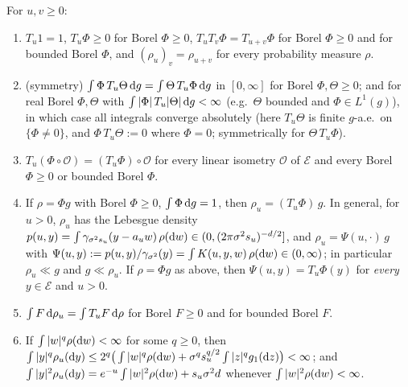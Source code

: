 \begin{lemma}\label{lem:M1}
For $u,v\ge0$:
\begin{enumerate}[label=(\roman*),itemsep=1pt]
\item $T_u1=1$, $T_u\Phi\ge0$ for Borel $\Phi\ge0$, $T_uT_v\Phi=T_{u+v}\Phi$ for Borel $\Phi\ge0$ and for bounded Borel $\Phi$, and $(\rho_u)_v=\rho_{u+v}$ for every probability measure $\rho$.
\item (symmetry) $\int\Phi\,T_u\Theta\,\mathrm{d} g=\int\Theta\,T_u\Phi\,\mathrm{d} g$ in $[0,\infty]$ for Borel $\Phi,\Theta\ge0$; and for real Borel $\Phi,\Theta$ with $\int|\Phi|\,T_u|\Theta|\,\mathrm{d} g<\infty$ (e.g.\ $\Theta$ bounded and $\Phi\in L^1(g)$), in which case all integrals converge absolutely (here $T_u\Theta$ is finite $g$-a.e.\ on $\{\Phi\ne0\}$, and $\Phi\,T_u\Theta:=0$ where $\Phi=0$; symmetrically for $\Theta\,T_u\Phi$).
\item $T_u(\Phi\circ\mathcal O)=(T_u\Phi)\circ\mathcal O$ for every linear isometry $\mathcal O$ of $\mathcal E$ and every Borel $\Phi\ge0$ or bounded Borel $\Phi$.
\item If $\rho=\Phi g$ with Borel $\Phi\ge0$, $\int\Phi\,\mathrm{d} g=1$, then $\rho_u=(T_u\Phi)\,g$.
In general, for $u>0$, $\rho_u$ has the Lebesgue density $p(u,y)=\int\gamma_{\sigma^2s_u}(y-a_uw)\,\rho(\mathrm{d} w)\in(0,(2\pi\sigma^2s_u)^{-d/2}]$, and
$\rho_u=\Psi(u,\cdot)\,g$ with $\Psi(u,y):=p(u,y)/\gamma_{\sigma^2}(y)=\int K(u,y,w)\,\rho(\mathrm{d} w)\in(0,\infty)$; in particular $\rho_u\ll g$ and $g\ll\rho_u$.
If $\rho=\Phi g$ as above, then $\Psi(u,y)=T_u\Phi(y)$ for \emph{every} $y\in\mathcal E$ and $u>0$.
\item $\int F\,\mathrm{d}\rho_u=\int T_uF\,\mathrm{d}\rho$ for Borel $F\ge0$ and for bounded Borel $F$.
\item If $\int|w|^q\rho(\mathrm{d} w)<\infty$ for some $q\ge0$, then $\int|y|^q\rho_u(\mathrm{d} y)\le2^q\big(\int|w|^q\rho(\mathrm{d} w)+\sigma^qs_u^{q/2}\int|z|^qg_1(\mathrm{d} z)\big)<\infty$; and $\int|y|^2\rho_u(\mathrm{d} y)=e^{-u}\int|w|^2\rho(\mathrm{d} w)+s_u\sigma^2d$ whenever $\int|w|^2\rho(\mathrm{d} w)<\infty$.
\end{enumerate}
\end{lemma}

